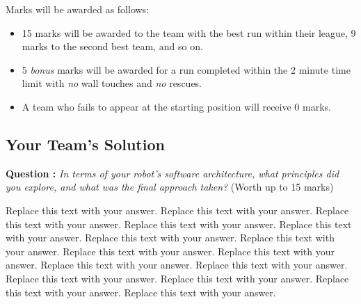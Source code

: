 \documentclass[hidelinks,a4paper,11pt]{article}
\newcounter{question}
\newcommand\myq{\refstepcounter{question}\thequestion}
\begin{document}
	Marks will be awarded as follows:
	\begin{itemize}
		\item 15 marks will be awarded to the team with the best run within their league, 9 marks to the second best team, and so on.
		\item 5 \emph{bonus} marks will be awarded for a run completed within the 2 minute time limit with \emph{no} wall touches and \emph{no} rescues.
		\item A team who fails to appear at the starting position will receive 0 marks.
	\end{itemize}
	
	
	\subsection{Your Team's Solution}
	
	{\bfseries Question \myq:}  \emph{In terms of your robot's software architecture, what principles did you explore, and what was the final approach taken?} (Worth up to 15 marks)\\
	\begin{mdframed}
		Replace this text with your answer.  Replace this text with your answer.  Replace this text with your answer.  Replace this text with your answer.  Replace this text with your answer.  Replace this text with your answer.  Replace this text with your answer.  Replace this text with your answer.  Replace this text with your answer.  Replace this text with your answer.  Replace this text with your answer.  Replace this text with your answer.  Replace this text with your answer.  Replace this text with your answer.  Replace this text with your answer.
	\end{mdframed}
	\vspace*{\baselineskip}
	
\end{document}
